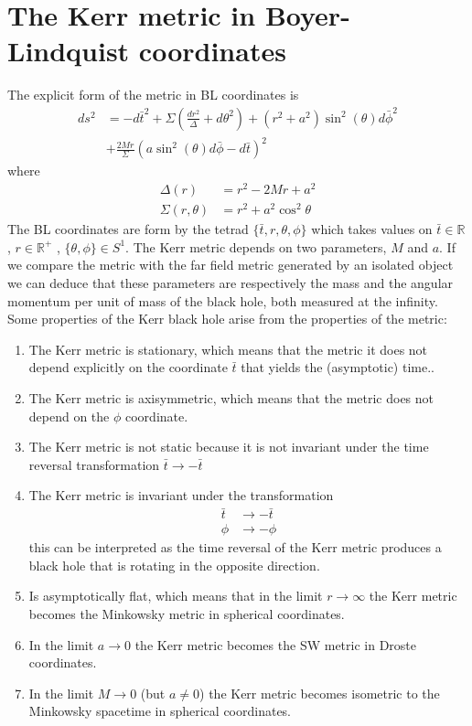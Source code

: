\section{The Kerr metric in Boyer-Lindquist coordinates}
The explicit form of the metric in \gls{BL} coordinates is
 \begin{align*}
 ds^2&=-d\bar{t}^2+ \Sigma \left(\frac{dr^2}{\Delta}+d\theta^2 \right)+(r^2+a^2)\sin^2{(\theta)} d\bar{\phi}^2\\
 &+\frac{2 M r}{\Sigma}(a \sin^2{(\theta)} d \bar{\phi} -d\bar{t})^2
\end{align*}
where
\begin{align}
 \Delta(r)&=r^2-2Mr+a^2\\
 \Sigma(r,\theta)&=r^2+a^2 \cos^2 \theta
\end{align}
The \gls{BL} coordinates are form by the tetrad $\{\bar{t},r,\theta,\phi\}$ which takes values on $\bar{t}\in \mathbb{R}$, $r \in \mathbb{R}^+$ , $\{\theta,\phi \} \in S^1$. The Kerr metric depends on two parameters, $M$ and $a$. If we compare the metric with the far field metric generated by an isolated object we can deduce that these parameters are respectively the mass and the angular momentum per unit of mass of the black hole, both measured at the infinity. Some properties of the Kerr black hole arise from the properties of the metric:
\begin{enumerate}
 \item The Kerr metric is stationary, which means that the metric it does not depend explicitly on the coordinate $\bar t$ that yields the (asymptotic) time..
 \item The Kerr metric is axisymmetric, which means that the metric does not depend on the $\phi$ coordinate.
 \item The Kerr metric is not static because it is not invariant under the time reversal transformation $\bar{t} \rightarrow -\bar{t}$
 \item The Kerr metric is invariant under the transformation
 \begin{align}
  \bar{t} & \rightarrow -\bar{t}\\
  \phi & \rightarrow - \phi
 \end{align}
this can be interpreted as the time reversal of the Kerr metric produces a black hole that is rotating in the opposite direction.
\item Is asymptotically flat, which means that in the limit $r \to \infty$ the Kerr metric becomes the Minkowsky metric in spherical coordinates.
\item In the limit $a \to 0$ the Kerr metric becomes the \gls{SW} metric in Droste coordinates.
\item In the limit $M \to 0$ (but $a \neq 0$) the Kerr metric becomes isometric to the Minkowsky spacetime in spherical coordinates.
\end{enumerate}

